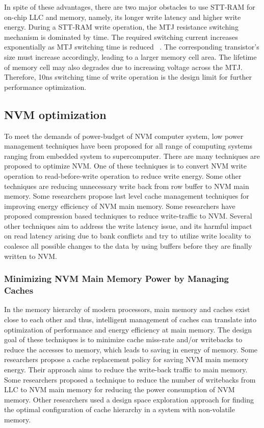 In spite of these advantages,  there are two major obstacles to use STT-RAM for on-chip LLC and memory, namely, its longer write latency and higher write energy. During a STT-RAM write operation, the MTJ resistance switching mechanism is dominated by time. The required switching current increases exponentially as MTJ switching time is reduced ~\cite{xu}. The corresponding transistor’s size must increase accordingly, leading to a larger memory cell area. The lifetime of memory cell may also degrades due to increasing voltage across the MTJ. Therefore, 10ns switching time of write operation is the design limit for further performance optimization.  



\subsection{NVM optimization}
\label{sec:background:optimization}

To meet the demands of power-budget of NVM computer system, low power management techniques have been proposed for all range of computing systems ranging from embedded system to supercomputer. There are many techniques are proposed to optimize NVM. One of these techniques is to convert NVM write operation to read-before-write operation to reduce write energy. Some other techniques are reducing unnecessary write back from row buffer to NVM main memory. Some researchers propose last level cache management techniques for improving energy efficiency of NVM main memory. Some researchers have proposed compression based techniques to reduce write-traffic to NVM. Several other techniques aim to address the write latency issue, and its harmful impact on read latency arising due to bank conflicts and try to utilize write locality to coalesce all possible changes to the data by using buffers before they are finally written to NVM. 


\subsubsection{Minimizing NVM Main Memory Power by Managing Caches}
In the memory hierarchy of modern processors, main memory and caches exist close to each other and thus, intelligent management of caches can translate into optimization of performance and energy efficiency at main memory. The design goal of these techniques is to minimize cache miss-rate and/or writebacks to reduce the accesses to memory, which leads to saving in energy of memory. Some researchers propose a cache replacement policy for saving NVM main memory energy. Their approach aims to reduce the write-back traffic to main memory. Some researchers proposed a technique to reduce the number of writebacks from LLC to NVM main memory for reducing the power consumption of NVM memory. Other researchers used a design space exploration approach for finding the optimal configuration of cache hierarchy in a system with non-volatile memory.


